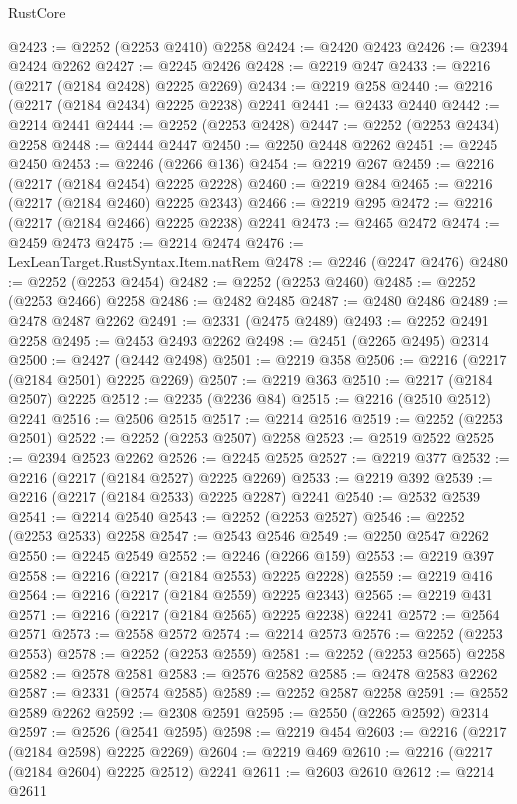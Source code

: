 \begin{lexlean}{RustCore}
\begin{coremodule}
@2423 := @2252 (@2253 @2410) @2258
@2424 := @2420 @2423
@2426 := @2394 @2424 @2262
@2427 := @2245 @2426
@2428 := @2219 @247
@2433 := @2216 (@2217 (@2184 @2428) @2225 @2269)
@2434 := @2219 @258
@2440 := @2216 (@2217 (@2184 @2434) @2225 @2238) @2241
@2441 := @2433 @2440
@2442 := @2214 @2441
@2444 := @2252 (@2253 @2428)
@2447 := @2252 (@2253 @2434) @2258
@2448 := @2444 @2447
@2450 := @2250 @2448 @2262
@2451 := @2245 @2450
@2453 := @2246 (@2266 @136)
@2454 := @2219 @267
@2459 := @2216 (@2217 (@2184 @2454) @2225 @2228)
@2460 := @2219 @284
@2465 := @2216 (@2217 (@2184 @2460) @2225 @2343)
@2466 := @2219 @295
@2472 := @2216 (@2217 (@2184 @2466) @2225 @2238) @2241
@2473 := @2465 @2472
@2474 := @2459 @2473
@2475 := @2214 @2474
@2476 := LexLeanTarget.RustSyntax.Item.natRem
@2478 := @2246 (@2247 @2476)
@2480 := @2252 (@2253 @2454)
@2482 := @2252 (@2253 @2460)
@2485 := @2252 (@2253 @2466) @2258
@2486 := @2482 @2485
@2487 := @2480 @2486
@2489 := @2478 @2487 @2262
@2491 := @2331 (@2475 @2489)
@2493 := @2252 @2491 @2258
@2495 := @2453 @2493 @2262
@2498 := @2451 (@2265 @2495) @2314
@2500 := @2427 (@2442 @2498)
@2501 := @2219 @358
@2506 := @2216 (@2217 (@2184 @2501) @2225 @2269)
@2507 := @2219 @363
@2510 := @2217 (@2184 @2507) @2225
@2512 := @2235 (@2236 @84)
@2515 := @2216 (@2510 @2512) @2241
@2516 := @2506 @2515
@2517 := @2214 @2516
@2519 := @2252 (@2253 @2501)
@2522 := @2252 (@2253 @2507) @2258
@2523 := @2519 @2522
@2525 := @2394 @2523 @2262
@2526 := @2245 @2525
@2527 := @2219 @377
@2532 := @2216 (@2217 (@2184 @2527) @2225 @2269)
@2533 := @2219 @392
@2539 := @2216 (@2217 (@2184 @2533) @2225 @2287) @2241
@2540 := @2532 @2539
@2541 := @2214 @2540
@2543 := @2252 (@2253 @2527)
@2546 := @2252 (@2253 @2533) @2258
@2547 := @2543 @2546
@2549 := @2250 @2547 @2262
@2550 := @2245 @2549
@2552 := @2246 (@2266 @159)
@2553 := @2219 @397
@2558 := @2216 (@2217 (@2184 @2553) @2225 @2228)
@2559 := @2219 @416
@2564 := @2216 (@2217 (@2184 @2559) @2225 @2343)
@2565 := @2219 @431
@2571 := @2216 (@2217 (@2184 @2565) @2225 @2238) @2241
@2572 := @2564 @2571
@2573 := @2558 @2572
@2574 := @2214 @2573
@2576 := @2252 (@2253 @2553)
@2578 := @2252 (@2253 @2559)
@2581 := @2252 (@2253 @2565) @2258
@2582 := @2578 @2581
@2583 := @2576 @2582
@2585 := @2478 @2583 @2262
@2587 := @2331 (@2574 @2585)
@2589 := @2252 @2587 @2258
@2591 := @2552 @2589 @2262
@2592 := @2308 @2591
@2595 := @2550 (@2265 @2592) @2314
@2597 := @2526 (@2541 @2595)
@2598 := @2219 @454
@2603 := @2216 (@2217 (@2184 @2598) @2225 @2269)
@2604 := @2219 @469
@2610 := @2216 (@2217 (@2184 @2604) @2225 @2512) @2241
@2611 := @2603 @2610
@2612 := @2214 @2611

\end{coremodule}
\end{lexlean}
